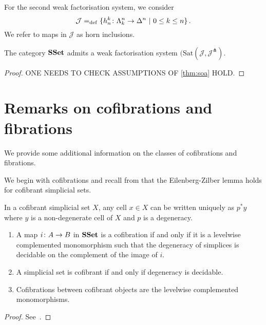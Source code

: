 \documentclass[reqno,10pt,a4paper,oneside,draft]{amsart}
\begin{document}
\bigskip


For the second weak factorisation system, we consider 
\[
\mathcal{J} =_{\operatorname{def}} \{ h^k_n  \colon \Lambda^n_k \to \Delta^{n} \ | \ 0 \leq k \leq n \} \, .
\]
We refer to maps in $\mathcal{J}$ as horn inclusions.

\begin{proposition} The category $\mathbf{SSet}$ admits a weak factorisation system $(\mathrm{Sat}(\mathcal{J}, 
\mathcal{J}^\pitchfork)$.
\end{proposition}

\begin{proof} ONE NEEDS TO CHECK ASSUMPTIONS OF \cref{thm:soa} HOLD.
\end{proof}



\section{Remarks on cofibrations and fibrations}

We provide some additional information on the classes of cofibrations and fibrations. 

\bigskip

We begin with cofibrations and recall from \cite[\S5.1.5]{henry2018wms} that the Eilenberg-Zilber lemma holds for cofibrant simplicial sets.

\begin{lemma}
\label{lem:EZ_cof}In a cofibrant simplicial set $X$, any cell $x \in X$ can be written uniquely as $p^* y$ where $y$ is a non-degenerate cell of $X$ and $p$ is a degeneracy.
\end{lemma}


\begin{proposition} \hfill 
\begin{enumerate}[$(i)$]
\item A map $i \colon A \to B$ in $\mathbf{SSet}$ is a cofibration if and only if it is a levelwise complemented monomorphism such that the degeneracy of simplices is decidable on the complement of the image of $i$. 
\item A simplicial set is cofibrant if and only if degeneracy is decidable.
\item Cofibrations between cofibrant
objects are the levelwise complemented monomorphisms.
\end{enumerate}
\end{proposition}

\begin{proof} See~\cite[Proposition 5.1.7]{henry2018wms}.
\end{proof}
\end{document}
